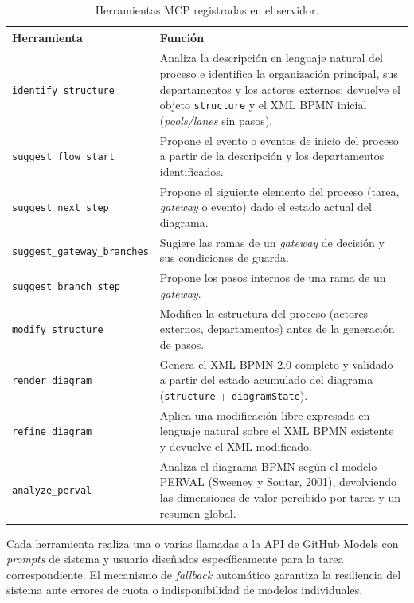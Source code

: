 \begin{table}[ht]
\centering
\small
\begin{tabular}{|l|p{8.8cm}|}
\hline
\rowcolor{gray!20} \textbf{Herramienta} & \textbf{Función} \\
\hline
\texttt{identify\_structure} & Analiza la descripción en lenguaje natural del proceso e identifica la organización principal, sus departamentos y los actores externos; devuelve el objeto \texttt{structure} y el XML BPMN inicial (\textit{pools/lanes} sin pasos). \\
\hline
\texttt{suggest\_flow\_start} & Propone el evento o eventos de inicio del proceso a partir de la descripción y los departamentos identificados. \\
\hline
\texttt{suggest\_next\_step} & Propone el siguiente elemento del proceso (tarea, \textit{gateway} o evento) dado el estado actual del diagrama. \\
\hline
\texttt{suggest\_gateway\_branches} & Sugiere las ramas de un \textit{gateway} de decisión y sus condiciones de guarda. \\
\hline
\texttt{suggest\_branch\_step} & Propone los pasos internos de una rama de un \textit{gateway}. \\
\hline
\texttt{modify\_structure} & Modifica la estructura del proceso (actores externos, departamentos) antes de la generación de pasos. \\
\hline
\texttt{render\_diagram} & Genera el XML BPMN 2.0 completo y validado a partir del estado acumulado del diagrama (\texttt{structure} + \texttt{diagramState}). \\
\hline
\texttt{refine\_diagram} & Aplica una modificación libre expresada en lenguaje natural sobre el XML BPMN existente y devuelve el XML modificado. \\
\hline
\texttt{analyze\_perval} & Analiza el diagrama BPMN según el modelo PERVAL (Sweeney y Soutar, 2001), devolviendo las dimensiones de valor percibido por tarea y un resumen global. \\
\hline
\end{tabular}
\caption{Herramientas MCP registradas en el servidor.}
\label{tab:herramientasMCP}
\end{table}

Cada herramienta realiza una o varias llamadas a la API de GitHub Models con \textit{prompts} de sistema y usuario diseñados específicamente para la tarea correspondiente. El mecanismo de \textit{fallback} automático garantiza la resiliencia del sistema ante errores de cuota o indisponibilidad de modelos individuales.

